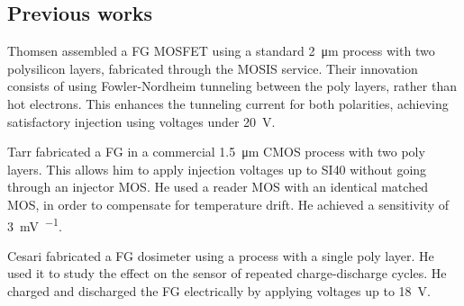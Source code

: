 \subsection{Previous works}
Thomsen\cite{thomsen_floating-gate_1991} assembled a FG MOSFET
using a standard \SI{2}{\micro\meter} process with two polysilicon layers,
fabricated through the MOSIS service\cite{noauthor_mosis_nodate}.
Their innovation consists of using Fowler-Nordheim tunneling between the poly layers,
rather than hot electrons.
This enhances the tunneling current for both polarities,
achieving satisfactory injection using voltages under \SI{20}{\volt}.

Tarr\cite{tarr_sensitive_2004} fabricated a FG in a commercial
\SI{1.5}{\micro\meter} CMOS process with two poly layers.
This allows him to apply injection voltages up to SI{40}{\volt}
without going through an injector MOS.
He used a reader MOS with an identical matched MOS,
in order to compensate for temperature drift.
He achieved a sensitivity of \SI{3}{\milli\volt\per\rad}.

Cesari\cite{cesari_floating_2014} fabricated a FG dosimeter
using a process with a single poly layer.
He used it to study the effect on the sensor of repeated charge-discharge cycles.
He charged and discharged the FG electrically by applying voltages up to
\SI{18}{\volt}.

%

